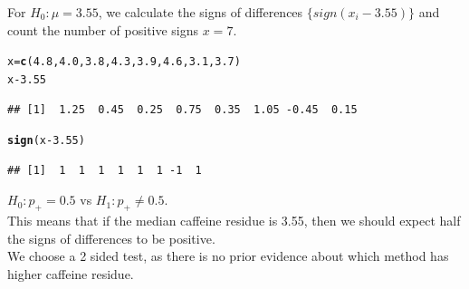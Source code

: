 \documentclass[t,xcolor=pdftex,dvipsnames,table]{beamer}
\makeatletter
\newcommand{\hlnum}[1]{\textcolor[rgb]{0.686,0.059,0.569}{#1}}%
\newcommand{\hlopt}[1]{\textcolor[rgb]{0,0,0}{#1}}%
\newcommand{\hlstd}[1]{\textcolor[rgb]{0.345,0.345,0.345}{#1}}%
\newcommand{\hlkwb}[1]{\textcolor[rgb]{0.69,0.353,0.396}{#1}}%
\newcommand{\hlkwd}[1]{\textcolor[rgb]{0.737,0.353,0.396}{\textbf{#1}}}%
\newenvironment{kframe}{%
 \def\at@end@of@kframe{}%
 \ifinner\ifhmode%
  \def\at@end@of@kframe{\end{minipage}}%
  \begin{minipage}{\columnwidth}%
 \fi\fi%
 \def\FrameCommand##1{\hskip\@totalleftmargin \hskip-\fboxsep
 \colorbox{shadecolor}{##1}\hskip-\fboxsep
     \hskip-\linewidth \hskip-\@totalleftmargin \hskip\columnwidth}%
 \MakeFramed {\advance\hsize-\width
   \@totalleftmargin\z@ \linewidth\hsize
   \@setminipage}}%
 {\par\unskip\endMakeFramed%
 \at@end@of@kframe}
\newenvironment{knitrout}{}{} %
\makeatother
\begin{document}
\begin{frame}[fragile]{}

For $H_{0}: \mu = 3.55$, we calculate the signs of differences $\{ sign(x_{i}-3.55) \}$  and count the number of positive signs $x=7$.

\begin{knitrout}
\color{fgcolor}\begin{kframe}
\begin{alltt}
\hlstd{x}\hlkwb{=}\hlkwd{c}\hlstd{(}\hlnum{4.8}\hlstd{,} \hlnum{4.0}\hlstd{,} \hlnum{3.8}\hlstd{,} \hlnum{4.3}\hlstd{,} \hlnum{3.9}\hlstd{,} \hlnum{4.6}\hlstd{,} \hlnum{3.1}\hlstd{,} \hlnum{3.7}\hlstd{)}
\hlstd{x}\hlopt{-}\hlnum{3.55}
\end{alltt}
\begin{verbatim}
## [1]  1.25  0.45  0.25  0.75  0.35  1.05 -0.45  0.15
\end{verbatim}
\begin{alltt}
\hlkwd{sign}\hlstd{(x}\hlopt{-}\hlnum{3.55}\hlstd{)}
\end{alltt}
\begin{verbatim}
## [1]  1  1  1  1  1  1 -1  1
\end{verbatim}
\end{kframe}
\end{knitrout}

\vspace{.5cm}
$H_{0}: p_{+} = 0.5$ vs $H_{1}: p_{+} \neq 0.5$.  \\
This means that if the median caffeine residue is 3.55, then we should expect half the signs of differences to be positive.\\
We choose a 2 sided test, as there is no prior evidence about which method has higher caffeine residue.

\end{frame}
\end{document}

